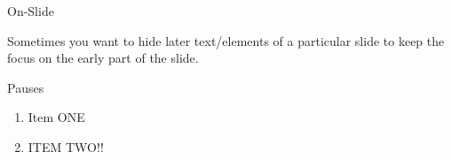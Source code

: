 \documentclass[12pt]{beamer}
\begin{document}
\begin{frame}{On-Slide}

	Sometimes you want to hide later text/elements of a particular slide to keep the focus on the early part of the slide.

	\bigskip


\end{frame}
\begin{frame}{Pauses}
\begin{enumerate}
\item Item ONE
\pause
\item ITEM TWO!! 
\end{enumerate}
\end{frame}






{\BackgroundShaded
\begin{frame}
\end{frame}
}





\iffalse

\section{First appendix section}

\begin{frame}{Appendix sample}

	Note that this slide doesn't count towards the total slides shown in the regular presentation

\end{frame}

\begin{frame}{hello}
    
\end{frame}
\fi
\end{document}
